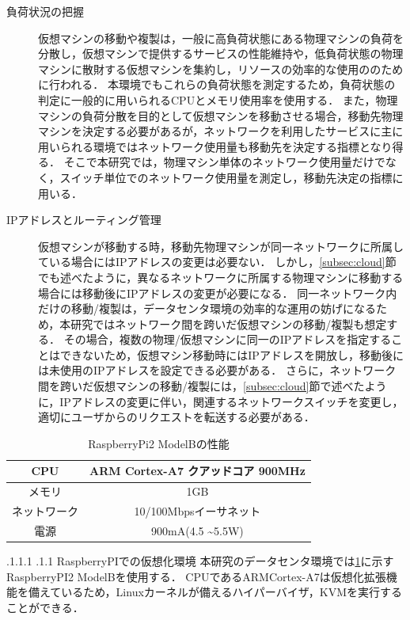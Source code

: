 \documentclass[a4paper, twocolumn]{jarticle}
\makeatletter
\def\subsection{\@startsection{subsection}{1}{\z@}%
 {.1\Cvs \@plus.1\Cdp \@minus.1\Cdp}%
 {.1\Cvs \@plus.1\Cdp}%
 {\normalfont\normalsize\bfseries}}
\makeatother
\begin{document}
\begin{description}
\item [負荷状況の把握]仮想マシンの移動や複製は，一般に高負荷状態にある物理マシンの負荷を分散し，仮想マシンで提供するサービスの性能維持や，低負荷状態の物理マシンに散財する仮想マシンを集約し，リソースの効率的な使用ののために行われる．
本環境でもこれらの負荷状態を測定するため，負荷状態の判定に一般的に用いられるCPUとメモリ使用率を使用する．
また，物理マシンの負荷分散を目的として仮想マシンを移動させる場合，移動先物理マシンを決定する必要があるが，ネットワークを利用したサービスに主に用いられる環境ではネットワーク使用量も移動先を決定する指標となり得る．
そこで本研究では，物理マシン単体のネットワーク使用量だけでなく，スイッチ単位でのネットワーク使用量を測定し，移動先決定の指標に用いる．

\item [IPアドレスとルーティング管理]仮想マシンが移動する時，移動先物理マシンが同一ネットワークに所属している場合にはIPアドレスの変更は必要ない．
しかし，\ref{subsec:cloud}節でも述べたように，異なるネットワークに所属する物理マシンに移動する場合には移動後にIPアドレスの変更が必要になる．
同一ネットワーク内だけの移動/複製は，データセンタ環境の効率的な運用の妨げになるため，本研究ではネットワーク間を跨いだ仮想マシンの移動/複製も想定する．
その場合，複数の物理/仮想マシンに同一のIPアドレスを指定することはできないため，仮想マシン移動時にはIPアドレスを開放し，移動後には未使用のIPアドレスを設定できる必要がある．
さらに，ネットワーク間を跨いだ仮想マシンの移動/複製には，\ref{subsec:cloud}節で述べたように，IPアドレスの変更に伴い，関連するネットワークスイッチを変更し，適切にユーザからのリクエストを転送する必要がある．
\end{description}

\begin{table}[tb]
	\centering
	\caption{RaspberryPi2 ModelBの性能}
	\label{tab:rpi2}
	{
		\small
		\begin{tabular}{|c|c|} \hline
		CPU & ARM Cortex-A7 クアッドコア 900MHz\\ \hline
		メモリ & 1GB\\ \hline
		ネットワーク & 10/100Mbpsイーサネット\\ \hline
		電源 & 900mA(4.5 \textasciitilde 5.5W)\\ \hline
		\end{tabular}
	}
\end{table}

\subsection{RaspberryPIでの仮想化環境}
本研究のデータセンタ環境では\ref{tab:rpi2}に示すRaspberryPI2 ModelBを使用する．
CPUであるARMCortex-A7は仮想化拡張機能を備えているため，Linuxカーネルが備えるハイパーバイザ，KVMを実行することができる．
\end{document}
